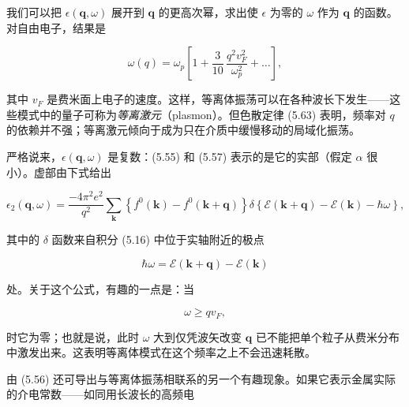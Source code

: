 我们可以把 $\epsilon(\mathbf{q},\omega)$ 展开到 $\mathbf{q}$ 的更高次幂，求出使 $\epsilon$ 为零的 $\omega$ 作为 $\mathbf{q}$ 的函数。对自由电子，结果是

\begin{equation*}
\omega(q) = \omega_p \left[ 1 + \frac{3}{10}\, \frac{q^2 v_F^2}{\omega_p^2} + \ldots \right],
\tag{5.63}
\end{equation*}

其中 $v_F$ 是费米面上电子的速度。这样，等离体振荡可以在各种波长下发生——这些模式中的量子可称为\emph{等离激元}（plasmon）。但色散定律 (5.63) 表明，频率对 $q$ 的依赖并不强；等离激元倾向于成为只在介质中缓慢移动的局域化振荡。

严格说来，$\epsilon(\mathbf{q},\omega)$ 是复数：(5.55) 和 (5.57) 表示的是它的实部（假定 $\alpha$ 很小）。虚部由下式给出

\begin{equation*}
\epsilon_2(\mathbf{q},\omega) = \frac{-4\pi^2 e^2}{q^2} \sum_{\mathbf{k}} \left\{ f^0(\mathbf{k}) - f^0(\mathbf{k}+\mathbf{q}) \right\} \delta\!\left\{ \mathcal{E}(\mathbf{k}+\mathbf{q}) - \mathcal{E}(\mathbf{k}) - \hbar\omega \right\},
\tag{5.64}
\end{equation*}

其中的 $\delta$ 函数来自积分 (5.16) 中位于实轴附近的极点

\begin{equation*}
\hbar\omega = \mathcal{E}(\mathbf{k}+\mathbf{q}) - \mathcal{E}(\mathbf{k})
\tag{5.65}
\end{equation*}

处。关于这个公式，有趣的一点是：当

\begin{equation*}
\omega \geqslant q v_F,
\tag{5.66}
\end{equation*}

时它为零；也就是说，此时 $\omega$ 大到仅凭波矢改变 $\mathbf{q}$ 已不能把单个粒子从费米分布中激发出来。这表明等离体模式在这个频率之上不会迅速耗散。

由 (5.56) 还可导出与等离体振荡相联系的另一个有趣现象。如果它表示金属实际的介电常数——如同用长波长的高频电
